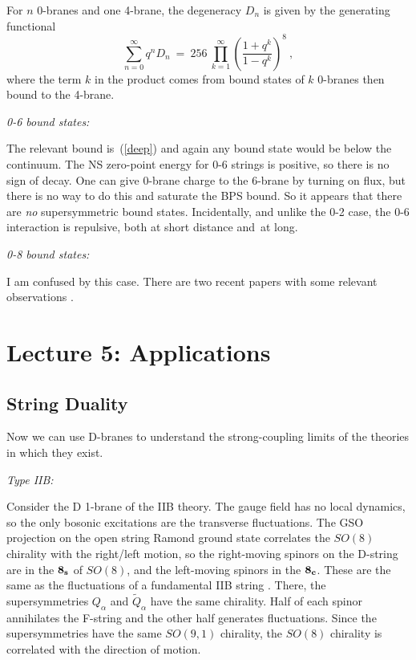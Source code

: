 \documentclass[12pt]{article}
\def\be{\begin{equation}}
\def\ee{\end{equation}}
\begin{document}
For $n$ 0-branes and one 4-brane, the degeneracy $D_n$ is given by the
generating functional\, \cite{vafa1}
\be
\sum_{n=0}^\infty q^n D_n\ =\ 256\ \prod_{k=1}^\infty \left( \frac{1 + q^k}{1
- q^k}\right)^8\ ,  \label{degen}
\ee
where the term $k$ in the product comes from bound states of $k$ 0-branes
then bound to the 4-brane.

{\it 0-6 bound states:} 

The relevant bound is~(\ref{deep}) and again any
bound state would be below the continuum.  The NS zero-point energy for 0-6
strings is positive, so there is no sign of decay.  One can give 0-brane
charge to the 6-brane
by turning on flux, but there is no way to do this and saturate the
BPS bound.  So it appears that there are {\it no} supersymmetric bound
states.  Incidentally, and unlike the 0-2 case, the 0-6 interaction is
repulsive, both at short distance and\, \cite{horpriv} at long.

{\it 0-8 bound states:} 

I am confused by this case.  There are two recent
papers with some relevant observations \cite{08}.

\section{Lecture 5: Applications}

\subsection{String Duality}

Now we can use D-branes to understand the strong-coupling limits of the
theories in which they exist.  

{\it Type IIB:}

Consider the D 1-brane of the IIB theory. The gauge field has no local
dynamics, so the only bosonic excitations are the transverse fluctuations.
The GSO projection on the open string Ramond ground state correlates the
$SO(8)$ chirality with the right/left motion, so the right-moving spinors on
the D-string are in the $\bf 8_s$ of $SO(8)$, and the left-moving spinors in
the $\bf 8_c$.
These are the same as the fluctuations of a
fundamental IIB string \cite{witbound}.  There, the supersymmetries
$Q_\alpha$ and $\tilde Q_\alpha$ have the same chirality.  Half of each
spinor annihilates the F-string and the other half generates fluctuations.
Since the supersymmetries have the same $SO(9,1)$ chirality, the $SO(8)$
chirality is correlated with the direction of motion.
\end{document}
